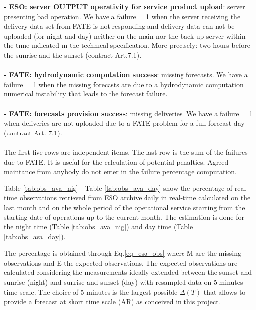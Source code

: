 \noindent
{\bf - ESO: server OUTPUT operativity for service product upload}: server presenting bad operation. We have a failure = 1 when the server receiving the delivery data-set from FATE is not responding and delivery data can not be uploaded (for night and day) neither on the main nor the back-up server within the time indicated in the technical specification.  More precisely: two hours before the sunrise and the sunset (contract Art.7.1). \\ \\
\noindent
{\bf - FATE: hydrodynamic computation success}: missing forecasts. We have a failure = 1 when the missing forecasts are due to a hydrodynamic computation numerical instability that leads to the forecast failure. \\ \\
\noindent
{\bf - FATE: forecasts provision success}:  missing deliveries. We have a failure = 1 when deliveries are not uploaded due to a FATE problem for a full forecast day (contract Art. 7.1). \\ \\ 

The first five rows are independent items. The last row is the sum of the failures due to FATE. It is useful for the calculation of potential penalties. Agreed maintance from anybody do not enter in the failure percentage computation.

Table \ref{tab:obs_ava_nig} - Table \ref{tab:obs_ava_day} show the percentage of real-time observations retrieved from ESO archive daily in real-time calculated on the last month and on the whole period of the operational service starting from the starting date of operations up to the current month. The estimation is done for the night time (Table \ref{tab:obs_ava_nig}) and day time (Table \ref{tab:obs_ava_day}).

The percentage is obtained through Eq.\ref{eq_eso_obs} where M are the missing observations and E the expected observations. The expected observations are calculated considering the measurements ideally extended between the sunset and sunrise (night) and sunrise and sunset (day) with resampled data on 5 minutes time scale. The choice of 5 minutes is the largest possible $\Delta(T)$ that allows to provide a forecast at short time scale (AR) as conceived in this project. 


